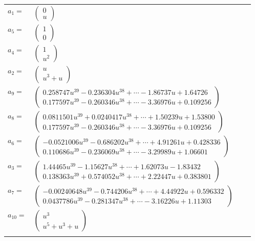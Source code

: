 \documentclass[1p]{elsarticle_modified}
\theoremstyle{definition}
\begin{document}
\begin{tabular}{m{7pt} m{180pt} m{7pt} m{180pt} }
\flushright $a_{1}=$&$\begin{pmatrix}0\\u\end{pmatrix}$ \\
\flushright $a_{5}=$&$\begin{pmatrix}1\\0\end{pmatrix}$ \\
\flushright $a_{4}=$&$\begin{pmatrix}1\\u^2\end{pmatrix}$ \\
\flushright $a_{2}=$&$\begin{pmatrix}u\\u^3+u\end{pmatrix}$ \\
\flushright $a_{9}=$&$\begin{pmatrix}0.258747 u^{39}-0.236304 u^{38}+\cdots-1.86737 u+1.64726\\0.177597 u^{39}-0.260346 u^{38}+\cdots-3.36976 u+0.109256\end{pmatrix}$ \\
\flushright $a_{8}=$&$\begin{pmatrix}0.0811501 u^{39}+0.0240417 u^{38}+\cdots+1.50239 u+1.53800\\0.177597 u^{39}-0.260346 u^{38}+\cdots-3.36976 u+0.109256\end{pmatrix}$ \\
\flushright $a_{6}=$&$\begin{pmatrix}-0.0521006 u^{39}-0.686202 u^{38}+\cdots+4.91261 u+0.428336\\0.110686 u^{39}-0.236069 u^{38}+\cdots-3.29989 u+1.06601\end{pmatrix}$ \\
\flushright $a_{3}=$&$\begin{pmatrix}1.44465 u^{39}-1.15627 u^{38}+\cdots+1.62073 u-1.83432\\0.138363 u^{39}+0.574052 u^{38}+\cdots+2.22447 u+0.383801\end{pmatrix}$ \\
\flushright $a_{7}=$&$\begin{pmatrix}-0.00240648 u^{39}-0.744206 u^{38}+\cdots+4.44922 u+0.596332\\0.0437786 u^{39}-0.281347 u^{38}+\cdots-3.16226 u+1.11303\end{pmatrix}$ \\
\flushright $a_{10}=$&$\begin{pmatrix}u^3\\u^5+u^3+u\end{pmatrix}$\\&\end{tabular}
\end{document}
